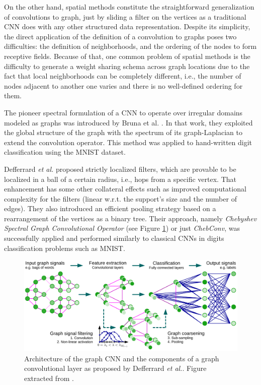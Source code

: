 On the other hand, spatial methods constitute the straightforward generalization of convolutions to graph, just by sliding a filter on the vertices as a traditional CNN does with any other structured data representation. Despite its simplicity, the direct application of the definition of a convolution to graphs poses two difficulties: the definition of neighborhoods, and the ordering of the nodes to form receptive fields. Because of that, one common problem of spatial methods is the difficulty to generate a weight sharing schema across graph locations due to the fact that local neighborhoods can be completely different, i.e., the number of nodes adjacent to another one varies and there is no well-defined ordering for them.

The pioneer spectral formulation of a CNN to operate over irregular domains modeled as graphs was introduced by Bruna et al. \cite{Bruna2013}. In that work, they exploited the global structure of the graph with the spectrum of its graph-Laplacian to extend the convolution operator. This method was applied to hand-written digit classification using the \ac{MNIST} dataset.

Defferrard \emph{et al.} \cite{Defferrard2016} proposed strictly localized filters, which are provable to be localized in a ball of a certain radius, i.e., hops from a specific vertex. That enhancement has some other collateral effects such as improved computational complexity for the filters (linear w.r.t. the support’s size and the number of edges). They also introduced an efficient  pooling strategy based on a rearrangement of the vertices as a binary tree. Their approach, namely \emph{Chebyshev Spectral Graph Convolutional Operator} (see Figure \ref{fig:tactile:defferrard}) or just \emph{ChebConv}, was successfully applied and performed similarly to classical \acp{CNN} in digits classification problems such as \acs{MNIST}.

\begin{figure}[!htb]
    \centering
    \includegraphics[width=0.95\linewidth]{Figures/Tactile/defferrard}
    \caption{Architecture of the graph \ac{CNN} and the components of a graph convolutional layer as proposed by Defferrard \emph{et al.}. Figure extracted from \cite{Defferrard2016}.}
    \label{fig:tactile:defferrard}
\end{figure}


